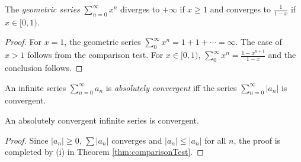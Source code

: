 \begin{thm}
  \label{thm:geometricSeries}
  The \emph{geometric series} $\sum_{n=0}^{\infty} x^n$
  diverges to $+\infty$ if $x\ge 1$
  and converges to $\frac{1}{1-x}$ if $x\in [0,1)$.
\end{thm}
\begin{proof}
  For $x=1$, the geometric series
  $\sum_0^{\infty} x^n = 1 + 1+\cdots = \infty$.
  The case of $x>1$ follows from the comparison test.
  For $x\in[0,1)$,
  $\sum_0^{\infty} x^n = \frac{1-x^{n+1}}{1-x}$
  and the conclusion follows.
\end{proof}

\begin{defn}
  \label{def:absoluteConvergence}
  An infinite series $\sum_{n=0}^{\infty} a_n$
  is \emph{absolutely convergent}
  iff the series $\sum_{n=0}^{\infty} |a_n|$ is convergent.
\end{defn}

\begin{lem}
  \label{lem:absolutelyConvergenceSeriesConverge}
  An absolutely convergent infinite series is convergent.
\end{lem}
\begin{proof}
  Since $|a_{n}|\ge 0$,  $\sum |a_{n}|$ converges and
  $|a_{n}|\le |a_{n}|$ for all $n$, the proof is completed by
  (i) in Theorem \ref{thm:comparisonTest}.
\end{proof}

